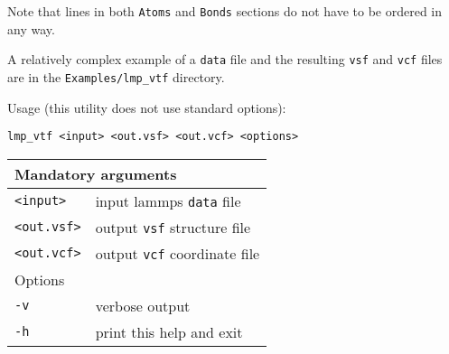 Note that lines in both \texttt{Atoms} and \texttt{Bonds} sections do not
have to be ordered in any way.

A relatively complex example of a \texttt{data} file and the resulting
\texttt{vsf} and \texttt{vcf} files are in the \texttt{Examples/lmp\_vtf}
directory.

Usage (this utility does not use standard options):

\vspace{1em}
\noindent
\texttt{lmp\_vtf <input> <out.vsf> <out.vcf> <options>}

\noindent
\begin{longtable}{p{}p{}}
  \toprule
  \multicolumn{2}{l}{Mandatory arguments} \\
  \midrule
  \texttt{<input>} & input lammps \texttt{data} file \\
  \texttt{<out.vsf>} & output \texttt{vsf} structure file \\
  \texttt{<out.vcf>} & output \texttt{vcf} coordinate file \\
  \toprule
  \multicolumn{2}{l}{Options}\\
  \midrule
  \texttt{-v} & verbose output\\
  \texttt{-h} & print this help and exit\\
  \bottomrule
\end{longtable}
